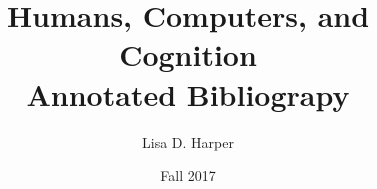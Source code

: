 \documentclass[12pt]{article}
\begin{document}
\title{Humans, Computers, and Cognition \\ Annotated Bibliograpy}
\author{Lisa D. Harper}
\date{Fall 2017}
\maketitle





\end{document}
